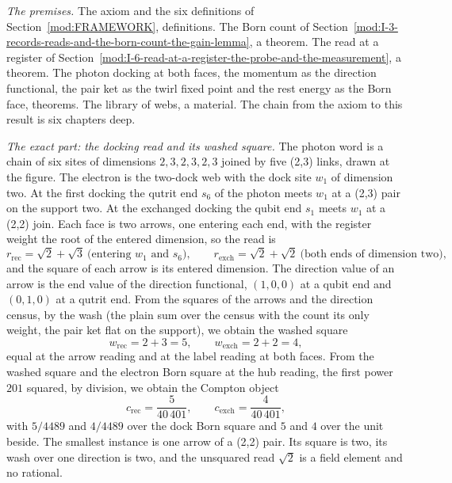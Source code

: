 \begin{chproof}
\textit{The premises.} The axiom and the six definitions of Section~\ref{mod:FRAMEWORK}, definitions. The Born count of Section~\ref{mod:I-3-records-reads-and-the-born-count-the-gain-lemma}, a theorem. The read at a register of Section~\ref{mod:I-6-read-at-a-register-the-probe-and-the-measurement}, a theorem. The photon docking at both faces, the momentum as the direction functional, the pair ket as the twirl fixed point and the rest energy as the Born face, theorems. The library of webs, a material. The chain from the axiom to this result is six chapters deep.

\textit{The exact part: the docking read and its washed square.} The photon word is a chain of six sites of dimensions $2,3,2,3,2,3$ joined by five (2,3) links, drawn at the figure. The electron is the two-dock web with the dock site $w_1$ of dimension two. At the first docking the qutrit end $s_6$ of the photon meets $w_1$ at a (2,3) pair on the support two. At the exchanged docking the qubit end $s_1$ meets $w_1$ at a (2,2) join. Each face is two arrows, one entering each end, with the register weight the root of the entered dimension, so the read is
\begin{equation}
r_{\mathrm{rec}}=\sqrt{2}+\sqrt{3}\ \text{(entering $w_1$ and $s_6$)},\qquad r_{\mathrm{exch}}=\sqrt{2}+\sqrt{2}\ \text{(both ends of dimension two)},
\end{equation}
and the square of each arrow is its entered dimension. The direction value of an arrow is the end value of the direction functional, $(1,0,0)$ at a qubit end and $(0,1,0)$ at a qutrit end. From the squares of the arrows and the direction census, by the wash (the plain sum over the census with the count its only weight, the pair ket flat on the support), we obtain the washed square
\begin{equation}
w_{\mathrm{rec}}=2+3=5,\qquad w_{\mathrm{exch}}=2+2=4 ,
\end{equation}
equal at the arrow reading and at the label reading at both faces. From the washed square and the electron Born square at the hub reading, the first power $201$ squared, by division, we obtain the Compton object
\begin{equation}
c_{\mathrm{rec}}=\frac{5}{40\,401},\qquad c_{\mathrm{exch}}=\frac{4}{40\,401},
\end{equation}
with $5/4489$ and $4/4489$ over the dock Born square and $5$ and $4$ over the unit beside. The smallest instance is one arrow of a (2,2) pair. Its square is two, its wash over one direction is two, and the unsquared read $\sqrt{2}$ is a field element and no rational.


\end{chproof}
